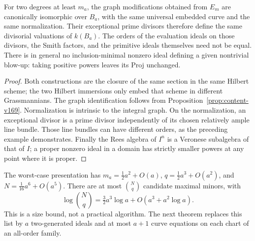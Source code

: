 \begin{proposition}
\label{prop:degree-change-v169}
For two degrees at least $m_a$, the graph modifications obtained from
$E_m$ are canonically isomorphic over $B_a$, with the same universal
embedded curve and the same normalization. Their exceptional prime
divisors therefore define the same divisorial valuations of $k(B_a)$.
The orders of the evaluation ideals on those divisors, the Smith
factors, and the primitive ideals themselves need not be equal.
There is in general no inclusion-minimal nonzero ideal defining a
given nontrivial blow-up: taking positive powers leaves its Proj
unchanged.
\end{proposition}
\begin{proof}
Both constructions are the closure of the same section in the same
Hilbert scheme; the two Hilbert immersions only embed that scheme in
different Grassmannians. The graph identification follows from
Proposition~\ref{prop:content-v169}. Normalization is intrinsic to the
integral graph. On the normalization, an exceptional divisor is a
prime divisor independently of its chosen relatively ample line
bundle. Those line bundles can have different orders, as the preceding
example demonstrates. Finally the Rees algebra of $I^n$ is a Veronese
subalgebra of that of $I$; a proper nonzero ideal in a domain has
strictly smaller powers at any point where it is proper.
\end{proof}

The worst-case presentation has $m_a=\tfrac12a^2+O(a)$,
$q=\tfrac12a^3+O(a^2)$, and $N=\tfrac1{16}a^6+O(a^5)$. There are at
most $\binom Nq$ candidate maximal minors, with
\[
 \log\binom Nq=\tfrac32a^3\log a+O(a^3+a^2\log a).
\]
This is a size bound, not a practical algorithm. The next theorem
replaces this list by $a$ two-generated ideals and at most $a+1$
curve equations on each chart of an all-order family.
